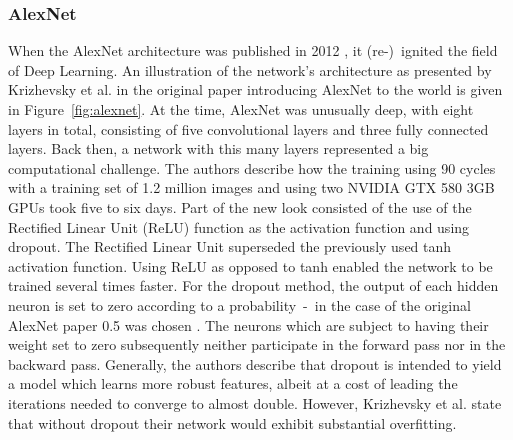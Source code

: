 \subsubsection{AlexNet}\label{alexnet}
When the AlexNet architecture was published in 2012 \citep{AlexNetoriginal}, it (re-)~ignited the field of Deep Learning. An illustration of the network's architecture as presented by Krizhevsky et al\@. in the original paper introducing AlexNet to the world is given in Figure~\ref{fig:alexnet}. At the time, AlexNet was unusually deep, with eight layers in total, consisting of five convolutional layers and three fully connected layers. Back then, a network with this many layers represented a big computational challenge. The authors describe how the training using 90 cycles with a training set of 1.2 million images and using two NVIDIA GTX 580 3GB GPUs took five to six days. Part of the new look consisted of the use of the Rectified Linear Unit (ReLU) function as the activation function and using dropout. The Rectified Linear Unit superseded the previously used tanh activation function. Using ReLU as opposed to tanh enabled the network to be trained several times faster. For the dropout method, the output of each hidden neuron is set to zero according to a probability~-~in the case of the original AlexNet paper 0.5 was chosen \citep{AlexNetoriginal}. The neurons which are subject to having their weight set to zero subsequently neither participate in the forward pass nor in the backward pass. Generally, the authors describe that dropout is intended to yield a model which learns more robust features, albeit at a cost of leading the iterations needed to converge to almost double. However, Krizhevsky et al\@. state that without dropout their network would exhibit substantial overfitting.
